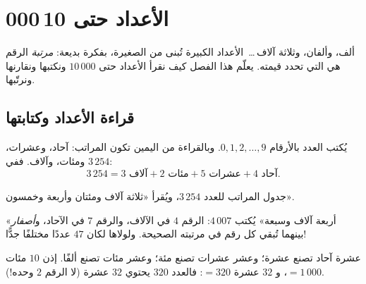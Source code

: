 \chapter{الأعداد حتى 10\,000}\label{ch:g3:numbers}

ألف، وألفان، وثلاثة آلاف\,\dots\ الأعداد الكبيرة تُبنى من الصغيرة،
بفكرة بديعة: \emph{مرتبة} الرقم هي التي تحدد قيمته. يعلّم هذا
الفصل كيف نقرأ الأعداد حتى $10\,000$ ونكتبها ونقارنها
ونرتّبها.

\section{قراءة الأعداد وكتابتها}

\begin{definition}\label{def:g3:numbers:place}
يُكتب العدد بالأرقام $0, 1, 2, \dots, 9$. وبالقراءة من
اليمين تكون المراتب: آحاد، وعشرات، ومئات، وآلاف. ففي
$3\,254$:
\[
3\,254 = 3 \text{ آلاف} + 2 \text{ مئات} + 5 \text{ عشرات}
+ 4 \text{ آحاد}.
\]
\end{definition}

\begin{omfigure}

{\small جدول المراتب للعدد $3\,254$، ويُقرأ «ثلاثة آلاف
ومئتان وأربعة وخمسون».}
\end{omfigure}

\begin{example}\label{ex:g3:numbers:zero}
«أربعة آلاف وسبعة» يُكتب $4\,007$: الرقم $4$ في
الآلاف، والرقم $7$ في الآحاد، و\emph{أصفار} بينهما تُبقي
كل رقم في مرتبته الصحيحة. ولولاها لكان $47$ عددًا
مختلفًا جدًّا!
\end{example}

\begin{example}[التبديل]\label{ex:g3:numbers:exchange}
عشرة آحاد تصنع عشرة؛ وعشر عشرات تصنع مئة؛ وعشر مئات تصنع
ألفًا. إذن $10$ مئات $= 1\,000$، و $32$ عشرة
$= 320$: فالعدد $320$ يحتوي $32$ عشرة (لا الرقم
$2$ وحده!).
\end{example}

